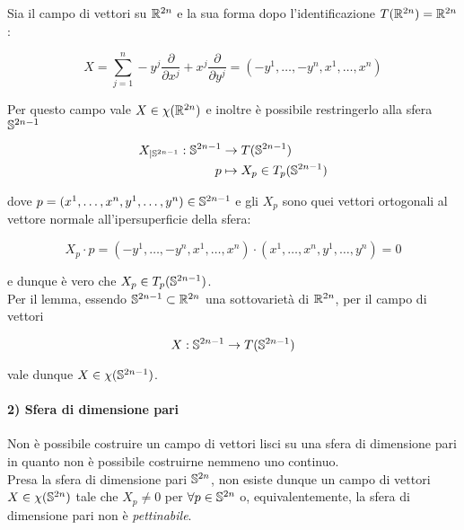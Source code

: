 Sia il campo di vettori su $ \R^{2n} $ e la sua forma dopo l'identificazione $ T(\R^{2n}) = \R^{2n} $:

\begin{equation}
	X = \sum_{j=1}^{n} - y^{j} \dfrac{\partial}{\partial x^{j}} + x^{j} \dfrac{\partial}{\partial y^{j}} = (-y^{1},\dots,-y^{n},x^{1},\dots,x^{n})
\end{equation}

Per questo campo vale $ X \in \chi(\R^{2n}) $ e inoltre è possibile restringerlo alla sfera $ \S^{2n-1} $

\begin{align}
	\begin{split}
		X_{|\S^{2n-1}} : \S^{2n-1} &\to T(\S^{2n-1})\\
		p &\mapsto X_{p} \in T_{p}(\S^{2n-1})
	\end{split}
\end{align}

dove $ p = (x^{1},\dots,x^{n},y^{1},\dots,y^{n}) \in \S^{2n-1} $ e gli $ X_{p} $ sono quei vettori ortogonali al vettore normale all'ipersuperficie della sfera:

\begin{equation}
	X_{p} \cdot p = (-y^{1},\dots,-y^{n},x^{1},\dots,x^{n}) \cdot (x^{1},\dots,x^{n},y^{1},\dots,y^{n}) = 0
\end{equation}

e dunque è vero che $ X_{p} \in T_{p}(\S^{2n-1}) $.\\
Per il lemma, essendo $ \S^{2n-1} \subset \R^{2n} $ una sottovarietà di $ \R^{2n} $, per il campo di vettori

\begin{equation}
	X : \S^{2n-1} \to T(\S^{2n-1})
\end{equation}

vale dunque $ X \in \chi(\S^{2n-1}) $.

\paragraph{2) Sfera di dimensione pari}

Non è possibile costruire un campo di vettori lisci su una sfera di dimensione pari in quanto non è possibile costruirne nemmeno uno continuo.\\
Presa la sfera di dimensione pari $ \S^{2n} $, non esiste dunque un campo di vettori $ X \in \chi(\S^{2n}) $ tale che $ X_{p} \neq 0 $ per $ \forall p \in \S^{2n} $ o, equivalentemente, la sfera di dimensione pari non è \textit{pettinabile}.

